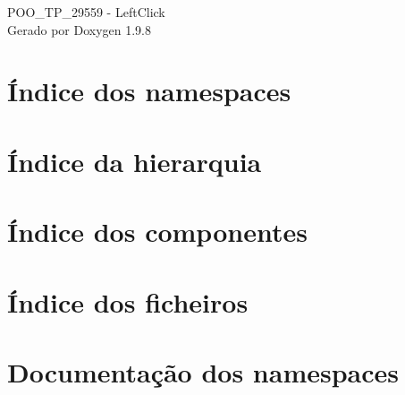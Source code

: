 \documentclass[twoside]{book}
\newcommand{\+}{\discretionary{\mbox{\scriptsize$\hookleftarrow$}}{}{}}
\newcommand{\clearemptydoublepage}{%
    \newpage{\pagestyle{empty}\cleardoublepage}%
  }
\begin{document}
  \raggedbottom
  \begin{titlepage}
  \vspace*{7cm}
  \begin{center}%
  {\Large POO\+\_\+\+TP\+\_\+29559 -\/ Left\+Click}\\
  \vspace*{1cm}
  {\large Gerado por Doxygen 1.9.8}\\
  \end{center}
  \end{titlepage}
  \clearemptydoublepage
  \tableofcontents
  \clearemptydoublepage

\chapter{Índice dos namespaces}

\chapter{Índice da hierarquia}

\chapter{Índice dos componentes}

\chapter{Índice dos ficheiros}

\chapter{Documentação dos namespaces}








\end{document}
